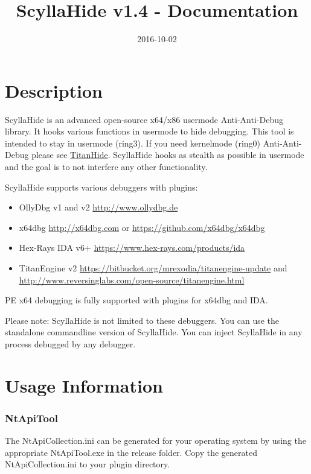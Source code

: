 \documentclass[10pt,a4paper]{article}
\title{ScyllaHide v1.4 - Documentation}
\author{}
\date{2016-10-02}
\begin{document}
\maketitle
 
\tableofcontents
\listoffigures
\lstlistoflistings

\newpage
{}

\section{Description}

ScyllaHide is an advanced open-source x64/x86 usermode Anti-Anti-Debug library. It hooks various functions in usermode to hide debugging. This tool is intended to stay in usermode (ring3). If you need kernelmode (ring0) Anti-Anti-Debug please see \href{https://bitbucket.org/mrexodia/titanhide}{TitanHide}. ScyllaHide hooks as stealth as possible in usermode and the goal is to not interfere any other functionality.

ScyllaHide supports various debuggers with plugins:
\begin{itemize}
\item OllyDbg v1 and v2 \url{http://www.ollydbg.de}
\item x64dbg \url{http://x64dbg.com} or \url{https://github.com/x64dbg/x64dbg}
\item Hex-Rays IDA v6+ \url{https://www.hex-rays.com/products/ida}
\item TitanEngine v2 \url{https://bitbucket.org/mrexodia/titanengine-update} and \url{http://www.reversinglabs.com/open-source/titanengine.html}
\end{itemize}

PE x64 debugging is fully supported with plugins for x64dbg and IDA.

Please note: ScyllaHide is not limited to these debuggers. You can use the standalone commandline version of ScyllaHide. You can inject ScyllaHide in any process debugged by any debugger.

\section{Usage Information}
\subsubsection{NtApiTool}
The NtApiCollection.ini can be generated for your operating system by using the appropriate NtApiTool.exe in the release folder. Copy the generated NtApiCollection.ini to your plugin directory.
\end{document}
